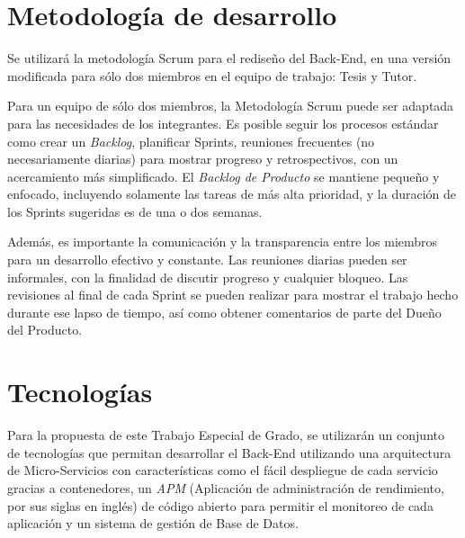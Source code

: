     \section{Metodología de desarrollo}

    Se utilizará la metodología Scrum para el rediseño del Back-End, en una versión modificada para sólo dos miembros en el equipo de trabajo: Tesis y Tutor.

    Para un equipo de sólo dos miembros, la Metodología Scrum puede ser adaptada para las necesidades de los integrantes. Es posible seguir los procesos estándar como crear un \textit{Backlog}, planificar Sprints, reuniones frecuentes (no necesariamente diarias) para mostrar progreso y retrospectivos, con un acercamiento más simplificado. El \textit{Backlog de Producto} se mantiene pequeño y enfocado, incluyendo solamente las tareas de más alta prioridad, y la duración de los Sprints sugeridas es de una o dos semanas.

    Además, es importante la comunicación y la transparencia entre los miembros para un desarrollo efectivo y constante. Las reuniones diarias pueden ser informales, con la finalidad de discutir progreso y cualquier bloqueo. Las revisiones al final de cada Sprint se pueden realizar para mostrar el trabajo hecho durante ese lapso de tiempo, así como obtener comentarios de parte del Dueño del Producto.

    \section{Tecnologías}

    Para la propuesta de este Trabajo Especial de Grado, se utilizarán un conjunto de tecnologías que permitan desarrollar el Back-End utilizando una arquitectura de Micro-Servicios con características como el fácil despliegue de cada servicio gracias a contenedores, un \textit{APM} (Aplicación de administración de rendimiento, por sus siglas en inglés) de código abierto para permitir el monitoreo de cada aplicación y un sistema de gestión de Base de Datos.

